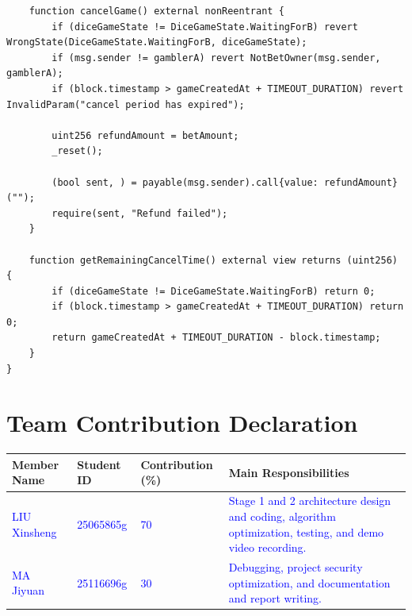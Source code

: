 \documentclass[10pt,a4paper]{article}
\begin{document}
\begin{lstlisting}
    function cancelGame() external nonReentrant {
        if (diceGameState != DiceGameState.WaitingForB) revert WrongState(DiceGameState.WaitingForB, diceGameState);
        if (msg.sender != gamblerA) revert NotBetOwner(msg.sender, gamblerA);
        if (block.timestamp > gameCreatedAt + TIMEOUT_DURATION) revert InvalidParam("cancel period has expired");
        
        uint256 refundAmount = betAmount;
        _reset();
        
        (bool sent, ) = payable(msg.sender).call{value: refundAmount}("");
        require(sent, "Refund failed");
    }
    
    function getRemainingCancelTime() external view returns (uint256) {
        if (diceGameState != DiceGameState.WaitingForB) return 0;
        if (block.timestamp > gameCreatedAt + TIMEOUT_DURATION) return 0;
        return gameCreatedAt + TIMEOUT_DURATION - block.timestamp;
    }
}
\end{lstlisting}

\newpage
\section*{Team Contribution Declaration}

\begin{table}[H]
\centering
\begin{tabularx}{\textwidth}{|X|X|X|X|}
\hline
\textbf{Member Name} & \textbf{Student ID} & \textbf{Contribution (\%)} & \textbf{Main Responsibilities} \\
\hline
\textcolor{blue}{LIU Xinsheng} & \textcolor{blue}{25065865g } & \textcolor{blue}{70} & \textcolor{blue}{Stage 1 and 2 architecture design and coding, algorithm optimization, testing, and demo video recording.} \\
\hline
\textcolor{blue}{MA Jiyuan} & \textcolor{blue}{25116696g} & \textcolor{blue}{30} & \textcolor{blue}{Debugging, project security optimization, and documentation and report writing.} \\
\hline
\end{tabularx}
\end{table}
\end{document}
